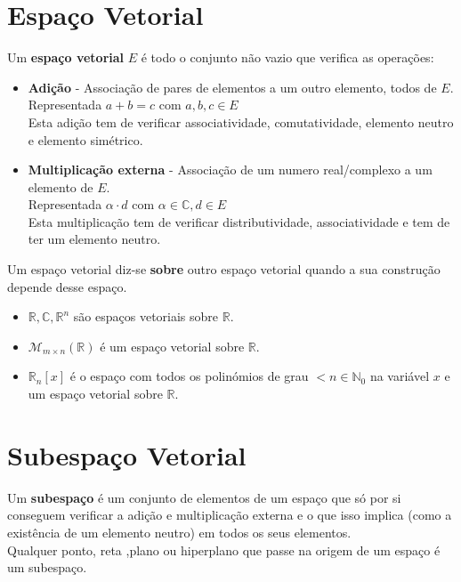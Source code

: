 \documentclass[]{report}
\begin{document}
\section{Espaço Vetorial}
Um \textbf{espaço vetorial} $E$ é todo o conjunto não vazio que verifica as operações:
\begin{itemize}
\item \textbf{Adição} - Associação de pares de elementos a um outro elemento, todos de $E$.\\
Representada $a+b=c$ com $a,b,c \in E$\\
Esta adição tem de verificar associatividade, comutatividade, elemento neutro e elemento simétrico.
\item \textbf{Multiplicação externa} - Associação de um numero real/complexo a um elemento de $E$.\\
Representada $\alpha \cdot d$ com $\alpha \in \mathbb{C}, d \in E$\\
Esta multiplicação tem de verificar distributividade, associatividade e tem de ter um elemento neutro.
\end{itemize}
Um espaço vetorial diz-se \textbf{sobre} outro espaço vetorial quando a sua construção depende desse espaço.
\begin{itemize}
\item $\mathbb{R, C, R}^n$ são espaços vetoriais sobre $\mathbb{R}$.
\item $\mathcal{M}_{m \times n}(\mathbb{R})$ é um espaço vetorial sobre $\mathbb{R}$.
\item $\mathbb{R}_n[x]$ é o espaço com todos os polinómios de grau $<n\in \mathbb{N}_0$ na variável $x$ e um espaço vetorial sobre $\mathbb{R}$.
\end{itemize}
\section{Subespaço Vetorial}
Um \textbf{subespaço} é um conjunto de elementos de um espaço que só por si conseguem verificar a adição e multiplicação externa e o que isso implica (como a existência de um elemento neutro) em todos os seus elementos.\\
Qualquer ponto, reta ,plano ou hiperplano que passe na origem de um espaço é um subespaço.
\end{document}

